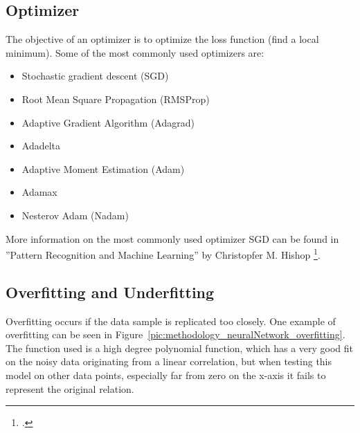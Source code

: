 \newpage

\subsection{Optimizer}
The objective of an optimizer is to optimize the loss function (find a local minimum). Some of the most commonly used optimizers are:

\begin{itemize}
	\item Stochastic gradient descent (SGD)
	\item Root Mean Square Propagation (RMSProp)
	\item Adaptive Gradient Algorithm (Adagrad)
	\item Adadelta
	\item Adaptive Moment Estimation (Adam)
	\item Adamax
	\item Nesterov Adam (Nadam)
\end{itemize}

More information on the most commonly used optimizer SGD can be found in ''Pattern Recognition and Machine Learning'' by Christopfer M. Hishop \footcite[page 144 and 240]{Bishop_Pattern_Recognition_and_Machine_Learning}.


\subsection{Overfitting and Underfitting}
Overfitting occurs if the data sample is replicated too closely. One example of overfitting can be seen in Figure~\ref{pic:methodology_neuralNetwork_overfitting}. The function used is a high degree polynomial function, which has a very good fit on the noisy data originating from a linear correlation, but when testing this model on other data points, especially far from zero on the x-axis it fails to represent the original relation.

